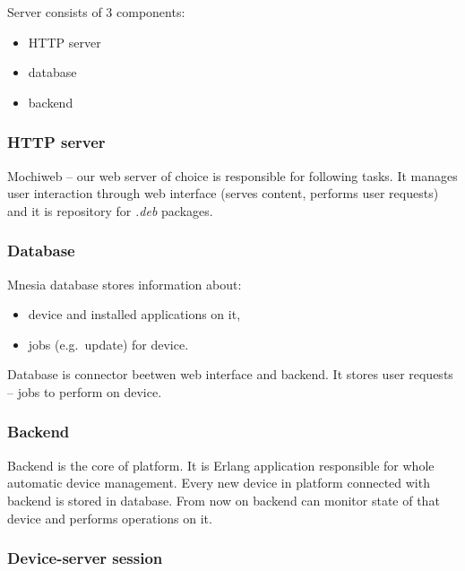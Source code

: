 Server consists of 3 components:
\begin{itemize}
  \item HTTP server
  \item database
  \item backend
\end{itemize}


\subsubsection*{HTTP server}

Mochiweb -- our web server of choice is responsible for following tasks. It manages user interaction
through web interface (serves content, performs user requests) and it is repository for \emph{.deb}
packages.


\subsubsection*{Database}

Mnesia database stores information about:
\begin{itemize}
  \item device and installed applications on it,
  \item jobs (e.g.\ update) for device.
\end{itemize}

\noindent Database is connector beetwen web interface and backend. It stores user requests -- jobs to perform
on device.


\subsubsection*{Backend}

Backend is the core of platform. It is Erlang application responsible for whole automatic device
management. Every new device in platform connected with backend is stored in database.
From now on backend can monitor state of that device and performs operations on it.

\subsubsection{Device-server session}

